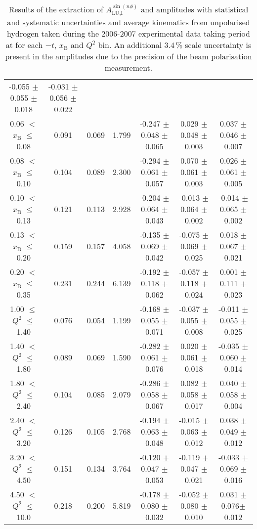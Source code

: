 \begin{table}[width=15cm]
\begin{center}
{\begin{tabular}{|c|c|c|c|c|c|c|}
-0.055 $\pm$   0.055  $\pm$   0.018 & -0.031  $\pm$  0.056  $\pm$   0.022\\
0.06 $<$ $x_{\textrm{B}}$ $\leqslant$ 0.08 &  0.091 & 0.069 &  1.799 &  -0.247  $\pm$  0.048  $\pm$   0.065 &
0.029 $\pm$  0.048  $\pm$   0.003 & 0.037 $\pm$   0.046  $\pm$   0.007\\
0.08 $<$ $x_{\textrm{B}}$ $\leqslant$ 0.10 &  0.104 & 0.089 &  2.300 &  -0.294 $\pm$  0.061  $\pm$   0.057 &
0.070 $\pm$   0.061  $\pm$   0.003 & 0.026  $\pm$  0.061  $\pm$   0.005\\
0.10 $<$ $x_{\textrm{B}}$ $\leqslant$ 0.13 &  0.121 &  0.113 &  2.928 &  -0.204  $\pm$  0.064   $\pm$  0.043 & 
-0.013  $\pm$  0.064  $\pm$   0.002 & -0.014  $\pm$  0.065  $\pm$   0.002\\
0.13 $<$ $x_{\textrm{B}}$ $\leqslant$ 0.20 &  0.159 & 0.157 &  4.058&  -0.135  $\pm$  0.069  $\pm$   0.042 &
-0.075  $\pm$  0.069  $\pm$   0.025 & 0.018  $\pm$  0.067  $\pm$   0.021 \\
0.20 $<$ $x_{\textrm{B}}$ $\leqslant$ 0.35 &  0.231 & 0.244 &  6.139 &  -0.192 $\pm$ 0.118  $\pm$   0.062 &
-0.057  $\pm$  0.118 $\pm$    0.024 & 0.001  $\pm$  0.111  $\pm$  0.023\\
\hline
1.00 $\leqslant$ $Q^{2}$ $\leqslant$ 1.40 &  0.076 & 0.054  & 1.199 &  -0.168  $\pm$  0.055  $\pm$   0.071 &
-0.037 $\pm$   0.055  $\pm$   0.008 & -0.011  $\pm$  0.055   $\pm$  0.025 \\
1.40 $<$ $Q^{2}$ $\leqslant$ 1.80 &  0.089 & 0.069 &  1.590 &  -0.282 $\pm$  0.061  $\pm$   0.076 &
0.020  $\pm$  0.061  $\pm$   0.018 & -0.035 $\pm$   0.060  $\pm$   0.014\\
1.80 $<$ $Q^{2}$ $\leqslant$ 2.40 &  0.104 & 0.085 &  2.079 &  -0.286 $\pm$   0.058  $\pm$   0.067 &
0.082 $\pm$   0.058  $\pm$   0.017 & 0.040  $\pm$  0.058  $\pm$   0.004\\
2.40 $<$ $Q^{2}$ $\leqslant$ 3.20 &  0.126 & 0.105  & 2.768 &  -0.194 $\pm$   0.063  $\pm$   0.048 &
-0.015  $\pm$  0.063 $\pm$    0.012 & 0.038   $\pm$ 0.049  $\pm$   0.012\\
3.20 $<$ $Q^{2}$ $\leqslant$ 4.50 &  0.151 & 0.134 &  3.764 &  -0.120 $\pm$   0.047  $\pm$   0.053 &
-0.119  $\pm$  0.047 $\pm$    0.021 & -0.033 $\pm$   0.069  $\pm$   0.016\\
4.50 $<$ $Q^{2}$ $\leqslant$ 10.0 &  0.218 & 0.200 &  5.819 &  -0.178  $\pm$  0.080 $\pm$    0.032 &
-0.052  $\pm$  0.080  $\pm$   0.010 & 0.031 $\pm$  0.076$ \pm$  0.012\\
\hline
  \end{tabular}
}
 \end{center}
\caption{Results of the extraction of $A_{\textrm{LU,I}}^{\sin(n\phi)}$ and   amplitudes with statistical and systematic uncertainties and average kinematics from unpolarised hydrogen taken during
the 2006-2007 experimental data taking period at  for each $-t$, $x_{\textrm{B}}$ and $Q^{2}$ bin.
An additional 3.4\,\% scale uncertainty is present in the amplitudes due to the precision of
the beam polarisation measurement.}
\end{table}

